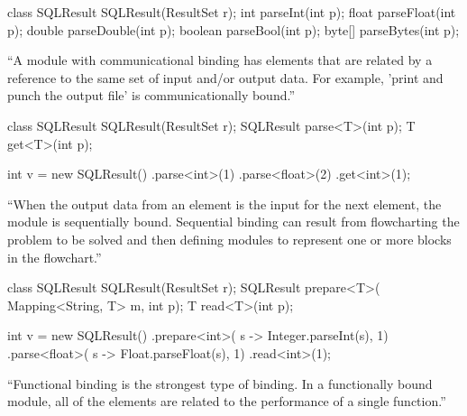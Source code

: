 \documentclass{article}
\begin{document}
\begin{multicols}{2}
{\small\begin{ffcode}
class SQLResult {
  SQLResult(ResultSet r);
  int parseInt(int p);
  float parseFloat(int p);
  double parseDouble(int p);
  boolean parseBool(int p);
  byte[] parseBytes(int p);
}
\end{ffcode}
}
\par\columnbreak\par
``A module with communicational binding has elements that are related by a reference to the same set of input and/or output data. For example, 'print and punch the output file' is communicationally bound.''
\end{multicols}
\plush{}

\begin{multicols}{2}
{\small\begin{ffcode}
class SQLResult {
  SQLResult(ResultSet r);
  SQLResult parse<T>(int p);
  T get<T>(int p);
}

int v = new SQLResult()
  .parse<int>(1)
  .parse<float>(2)
  .get<int>(1);
\end{ffcode}
}
\par\columnbreak\par
``When the output data from an element is the input for the next element, the module is sequentially bound. Sequential binding can result from flowcharting the problem to be solved and then defining modules to represent one or more blocks in the flowchart.''
\end{multicols}
\plush{}

\begin{multicols}{2}
{\scriptsize\begin{ffcode}
class SQLResult {
  SQLResult(ResultSet r);
  SQLResult prepare<T>(
    Mapping<String, T> m, int p);
  T read<T>(int p);
}

int v = new SQLResult()
  .prepare<int>(
    s -> Integer.parseInt(s), 1)
  .parse<float>(
    s -> Float.parseFloat(s), 1)
  .read<int>(1);
\end{ffcode}
}
\par\columnbreak\par
``Functional binding is the strongest type of binding. In a functionally bound module, all of the elements are related to the performance of a single function.''
\end{multicols}
\plush{}

\end{document}
